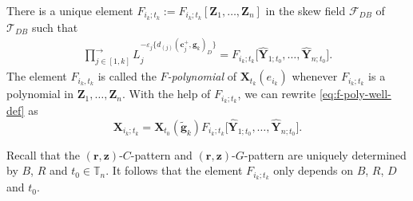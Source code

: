 \documentclass[pdftex]{sigma}
\numberwithin{equation}{section}
\begin{document}
\begin{Definition}
 There is a unique element $F_{i_k;t_k}:=F_{i_k;t_k}[\mathbf{Z}_1,\dots, \mathbf{Z}_n]$ in the skew field $\mathcal{F}_{DB}$ of~$\mathcal{T}_{DB}$ such that
 \begin{align}\label{eq:gupta-formula}
 \prod\limits^{\longrightarrow}_{j\in[1,k]}L_{j}^{-\varepsilon_{j}\{d_{(j)}(\mathbf{c}_{j}^{+},\mathbf{g}_{k})_D\}}=F_{i_k;t_k}\big[\hat{\mathbf{Y}}_{1;t_0},\dots, \hat{\mathbf{Y}}_{n;t_0}\big].
 \end{align}
 The element $F_{i_k,t_k}$ is called the {\it $F$-polynomial} of $\mathbf{X}_{t_k}(e_{i_k})$ whenever $F_{i_k;t_k}$ is a polynomial in $\mathbf{Z}_1,\dots,\mathbf{Z}_n$. With the help of $F_{i_k;t_k}$, we can rewrite \eqref{eq:f-poly-well-def} as
 \[
 \mathbf{X}_{i_k;t_k}=\mathbf{X}_{t_0}(\tilde{\mathbf{g}}_k)F_{i_k;t_k}\big[\hat{\mathbf{Y}}_{1;t_0},\dots, \hat{\mathbf{Y}}_{n;t_0}\big].
 \]

\end{Definition}
\begin{Remark}
 Recall that the $(\mathbf{r},\mathbf{z})$-$C$-pattern and $(\mathbf{r},\mathbf{z})$-$G$-pattern are uniquely determined by $B$, $R$ and $t_0\in \mathbb{T}_n$. It follows that the element $F_{i_k;t_k}$ only depends on $B$, $R$, $D$ and $t_0$.
\end{Remark}
\end{document}
